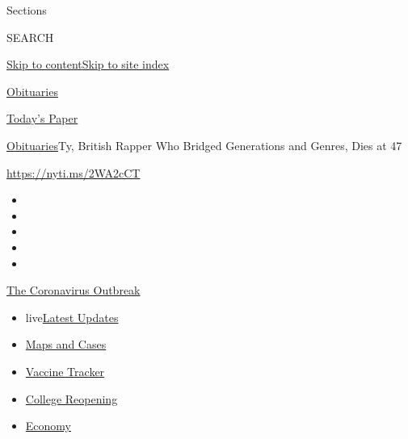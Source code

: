 Sections

SEARCH

\protect\hyperlink{site-content}{Skip to
content}\protect\hyperlink{site-index}{Skip to site index}

\href{https://www.nytimes.com/section/obituaries}{Obituaries}

\href{https://myaccount.nytimes.com/auth/login?response_type=cookie\&client_id=vi}{}

\href{https://www.nytimes.com/section/todayspaper}{Today's Paper}

\href{/section/obituaries}{Obituaries}\textbar{}Ty, British Rapper Who
Bridged Generations and Genres, Dies at 47

\url{https://nyti.ms/2WA2cCT}

\begin{itemize}
\item
\item
\item
\item
\item
\end{itemize}

\href{https://www.nytimes.com/news-event/coronavirus?action=click\&pgtype=Article\&state=default\&region=TOP_BANNER\&context=storylines_menu}{The
Coronavirus Outbreak}

\begin{itemize}
\tightlist
\item
  live\href{https://www.nytimes.com/2020/08/03/world/coronavirus-covid-19.html?action=click\&pgtype=Article\&state=default\&region=TOP_BANNER\&context=storylines_menu}{Latest
  Updates}
\item
  \href{https://www.nytimes.com/interactive/2020/us/coronavirus-us-cases.html?action=click\&pgtype=Article\&state=default\&region=TOP_BANNER\&context=storylines_menu}{Maps
  and Cases}
\item
  \href{https://www.nytimes.com/interactive/2020/science/coronavirus-vaccine-tracker.html?action=click\&pgtype=Article\&state=default\&region=TOP_BANNER\&context=storylines_menu}{Vaccine
  Tracker}
\item
  \href{https://www.nytimes.com/2020/08/02/us/covid-college-reopening.html?action=click\&pgtype=Article\&state=default\&region=TOP_BANNER\&context=storylines_menu}{College
  Reopening}
\item
  \href{https://www.nytimes.com/live/2020/08/03/business/stock-market-today-coronavirus?action=click\&pgtype=Article\&state=default\&region=TOP_BANNER\&context=storylines_menu}{Economy}
\end{itemize}

